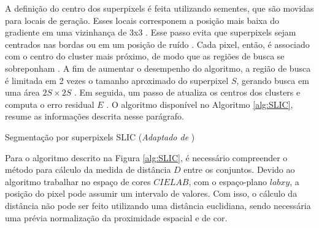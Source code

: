 \begin{document}
A definição do centro dos superpixels é feita utilizando sementes, que são movidas para locais de geração. Esses locais corresponem a posição mais baixa do gradiente em uma vizinhança de 3x3 \cite{SLIC}. Esse passo evita que superpixels sejam centrados nas bordas ou em um posição de ruído \cite{SLIC}. Cada pixel, então, é associado com o centro do cluster mais próximo, de modo que as regiões de busca se sobreponham \cite{SLIC}. A fim de aumentar o desempenho do algoritmo, a região de busca é limitada em 2 vezes o tamanho aproximado do superpixel $S$, gerando busca em uma área $2S \times 2S$ \cite{SLIC}. Em seguida, um passo de atualiza os centros dos clusters e computa o erro residual $E$ \cite{SLIC}. O algoritmo disponível no Algoritmo \ref{alg:SLIC}, resume as informações descrita nesse parágrafo.

\begin{algorithm}
    \caption{Segmentação por superpixels SLIC (\textit{Adaptado de } \cite{SLIC})}
    \label{alg:SLIC}
    \begin{algorithmic}[1]
        \Repeat
                \EndIf
                \EndFor
            \EndFor    
    \end{algorithmic}
\end{algorithm}


Para o algoritmo descrito na Figura \ref{alg:SLIC}, é necessário compreender o método para cálculo da medida de distância $D$ entre os conjuntos. Devido ao algoritmo trabalhar no espaço de cores $CIELAB$, com o espaço-plano $labxy$, a posição do pixel pode assumir um intervalo de valores. Com isso, o cálculo da distância não pode ser feito utilizando uma distância euclidiana, sendo necessária uma prévia normalização da proximidade espacial e de cor. 
\end{document}
